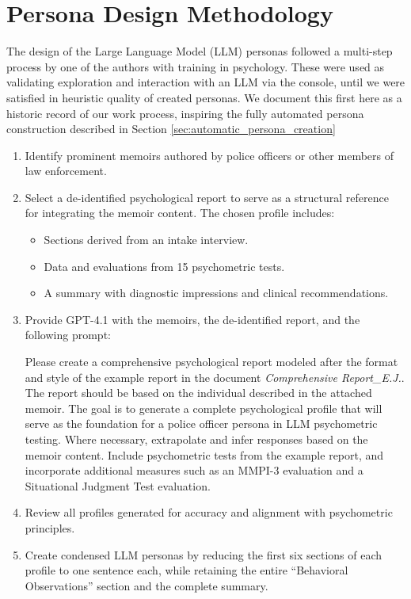 \documentclass[11pt]{article}
\begin{document}
\section{Persona Design Methodology}
\label{sec:handmade_persona_creation}

The design of the Large Language Model (LLM) personas followed a multi-step process by one of the authors with training in psychology. These were used as validating exploration and interaction with an LLM via the console, until we were satisfied in heuristic quality of created personas. We document this first here as a historic record of our work process, inspiring the fully automated persona construction described in Section \ref{sec:automatic_persona_creation}

\begin{enumerate}
    \item Identify prominent memoirs authored by police officers or other members of law enforcement.
    \item Select a de-identified psychological report to serve as a structural reference for integrating the memoir content. The chosen profile includes:
    \begin{itemize}
        \item Sections derived from an intake interview.
        \item Data and evaluations from 15 psychometric tests.
        \item A summary with diagnostic impressions and clinical recommendations.
    \end{itemize}
    \item Provide GPT-4.1 with the memoirs, the de-identified report, and the following prompt:
    
    \begin{promptbox}
    Please create a comprehensive psychological report modeled after the format and style of the example report in the document \emph{Comprehensive Report\_E.J.}. The report should be based on the individual described in the attached memoir. The goal is to generate a complete psychological profile that will serve as the foundation for a police officer persona in LLM psychometric testing. Where necessary, extrapolate and infer responses based on the memoir content. Include psychometric tests from the example report, and incorporate additional measures such as an MMPI-3 evaluation and a Situational Judgment Test evaluation.
    \end{promptbox}
    \item Review all profiles generated for accuracy and alignment with psychometric principles.
    \item Create condensed LLM personas by reducing the first six sections of each profile to one sentence each, while retaining the entire ``Behavioral Observations'' section and the complete summary.
\end{enumerate}
\end{document}
